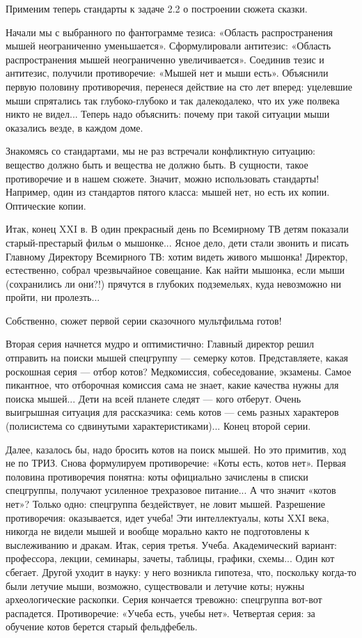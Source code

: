 Применим теперь стандарты к задаче 2.2 о построении сюжета сказки.

Начали мы с выбранного по фантограмме тезиса: «Область распространения
мышей неограниченно  уменьшается». Сформулировали  антитезис: «Область
распространения мышей  неограниченно увеличивается». Соединив  тезис и
антитезис, получили  противоречие: «Мышей нет и  мыши есть». Объяснили
первую  половину противоречия,  перенеся действие  на сто  лет вперед:
уцелевшие мыши спрятались так  глубоко-глубоко и так далекодалеко, что
их уже  полвека никто  не видел... Теперь  надо объяснить:  почему при
такой ситуации мыши оказались везде, в каждом доме.

Знакомясь со  стандартами, мы  не раз встречали  конфликтную ситуацию:
вещество  должно быть  и вещества  не должно  быть. В  сущности, такое
противоречие и  в нашем сюжете. Значит,  можно использовать стандарты!
Например,  один из  стандартов пятого  класса: мышей  нет, но  есть их
копии. Оптические копии.

Итак,  конец XXI  в. В  один прекрасный  день по  Всемирному ТВ  детям
показали старый-престарый  фильм о  мышонке... Ясное дело,  дети стали
звонить и писать Главному Директору Всемирного ТВ: хотим видеть живого
мышонка!  Директор, естественно,  собрал  чрезвычайное совещание.  Как
найти мышонка,  если мыши (сохранились  ли они?!) прячутся  в глубоких
подземельях, куда невозможно ни пройти, ни пролезть...

Собственно, сюжет первой серии сказочного мультфильма готов!


Вторая  серия начнется  мудро и  оптимистично: Главный  директор решил
отправить на  поиски мышей спецгруппу —  семерку котов. Представляете,
какая  роскошная  серия  — отбор  котов?  Медкомиссия,  собеседование,
экзамены.  Самое пикантное,  что  отборочная комиссия  сама не  знает,
какие качества нужны для поиска мышей... Дети на всей планете следят —
кого отберут. Очень выигрышная ситуация  для рассказчика: семь котов —
семь разных характеров (полисистема со сдвинутыми характеристиками)...
Конец второй серии.

Далее,  казалось  бы,  надо  бросить  котов на  поиск  мышей.  Но  это
примитив, ход не по ТРИЗ.  Снова формулируем противоречие: «Коты есть,
котов  нет». Первая  половина  противоречия  понятна: коты  официально
зачислены   в  списки   спецгруппы,  получают   усиленное  трехразовое
питание...  А   что  значит  «котов  нет»?   Только  одно:  спецгруппа
бездействует,  не ловит  мышей. Разрешение  противоречия: оказывается,
идет учеба! Эти интеллектуалы, коты  XXI века, никогда не видели мышей
и  вообще морально  както  не подготовлены  к  выслеживанию и  дракам.
Итак, серия третья. Учеба.  Академический вариант: профессора, лекции,
семинары, зачеты, таблицы, графики,  схемы... Один кот сбегает. Другой
уходит  в науку:  у него  возникла гипотеза,  что, поскольку  когда-то
были  летучие  мыши,  возможно,  существовали и  летучие  коты;  нужны
археологические раскопки. Серия кончается тревожно: спецгруппа вот-вот
распадется. Противоречие: «Учеба есть, учебы нет». Четвертая серия: за
обучение котов берется старый фельдфебель.

